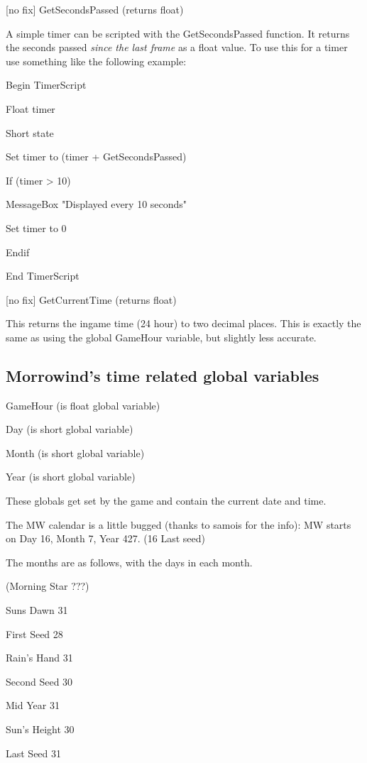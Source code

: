 \documentclass[
]{article}
\begin{document}
{[}no fix{]} GetSecondsPassed (returns float)

A simple timer can be scripted with the GetSecondsPassed function. It
returns the seconds passed \emph{since the last frame} as a float value.
To use this for a timer use something like the following example:

Begin TimerScript

Float timer

Short state

Set timer to (timer + GetSecondsPassed)

If (timer \textgreater{} 10)

MessageBox "Displayed every 10 seconds"

Set timer to 0

Endif

End TimerScript

{[}no fix{]} GetCurrentTime (returns float)

This returns the ingame time (24 hour) to two decimal places. This is
exactly the same as using the global GameHour variable, but slightly
less accurate.

\hypertarget{morrowinds-time-related-global-variables}{%
\subsection{Morrowind's time related global
variables}\label{morrowinds-time-related-global-variables}}

GameHour (is float global variable)

Day (is short global variable)

Month (is short global variable)

Year (is short global variable)

These globals get set by the game and contain the current date and time.

The MW calendar is a little bugged (thanks to samois for the info): MW
starts on Day 16, Month 7, Year 427. (16 Last seed)

The months are as follows, with the days in each month.

(Morning Star ???)

Suns Dawn 31

First Seed 28

Rain's Hand 31

Second Seed 30

Mid Year 31

Sun's Height 30

Last Seed 31
\end{document}
